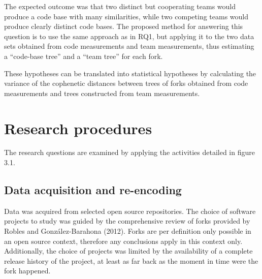 The expected outcome was that two distinct but cooperating teams would produce a code base with many similarities, while two competing teams would produce clearly distinct code bases. The proposed method for answering this question is to use the same approach as in RQ1, but applying it to the two data sets obtained from code measurements and team measurements, thus estimating a “code-base tree” and a “team tree” for each fork. 



\noindent
These hypotheses can be translated into statistical hypotheses by calculating the variance of the cophenetic distances between trees of forks obtained from code measurements and trees constructed from team measurements.



\section{Research procedures}
The research questions are examined by applying the activities detailed in figure 3.1.

\subsection{Data acquisition and re-encoding}
Data was acquired from selected open source repositories. The choice of software projects to study was guided by the comprehensive review of forks provided by Robles and González-Barahona (2012). Forks are per definition only possible in an open source context, therefore any conclusions apply in this context only. Additionally, the choice of projects was limited by the availability of a complete release history of the project, at least as far back as the moment in time were the fork happened.

